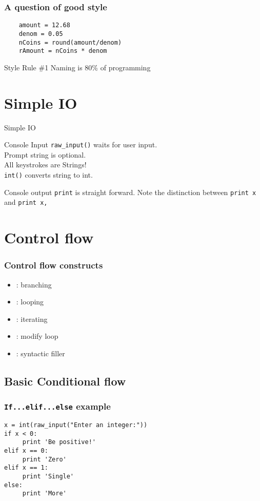 \documentclass[14pt,compress]{beamer}
\newcommand{\typ}[1]{\texttt{#1}}
\newcommand{\kwrd}[1]{ \texttt{\textbf{\color{blue}{#1}}}  }
\begin{document}
\begin{frame}[fragile] \frametitle{A question of good style}
  \begin{lstlisting}
    amount = 12.68
    denom = 0.05
    nCoins = round(amount/denom)
    rAmount = nCoins * denom
  \end{lstlisting}
  \pause
  \begin{block}{Style Rule \#1}
    Naming is 80\% of programming
  \end{block}
\end{frame}

\section{Simple IO}
\begin{frame}{Simple IO}
  \begin{block}
    {Console Input}
    \texttt{raw\_input()} waits for user input.\\Prompt string is optional.\\
    All keystrokes are Strings!\\\texttt{int()} converts string to int.
  \end{block}
  \begin{block}
    {Console output}
    \texttt{print} is straight forward. Note the distinction between \texttt{print x} and \texttt{print x,}
  \end{block}
\end{frame}

\section{Control flow}
\begin{frame}
  \frametitle{Control flow constructs}  
  \begin{itemize}
  \item \kwrd{if/elif/else}: branching
  \item \kwrd{while}: looping
  \item \kwrd{for}: iterating 
  \item \kwrd{break, continue}: modify loop 
  \item \kwrd{pass}: syntactic filler
  \end{itemize}
\end{frame}

\subsection{Basic Conditional flow}
\begin{frame}[fragile]
  \frametitle{\typ{If...elif...else} example}
\begin{lstlisting}
x = int(raw_input("Enter an integer:"))
if x < 0:
     print 'Be positive!'
elif x == 0:
     print 'Zero'
elif x == 1:
     print 'Single'
else:
     print 'More'
\end{lstlisting}
\end{frame}
\end{document}
